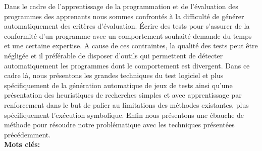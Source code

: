 \documentclass[
12pt, %
french, %
singlespacing, %
headsepline, %
]{MastersDoctoralThesis} %
\begin{document}





\newenvironment{abstract}%
{\cleardoublepage\thispagestyle{empty}\null\vfill\begin{center}%
\bfseries\abstractname\end{center}}%
{\vfill\null}

\begin{abstract}
Dans le cadre de l'apprentissage de la programmation et de l'évaluation des programmes des apprenants nous sommes confrontés à la difficulté de générer automatiquement des critères d'évaluation. Écrire des tests pour s'assurer de la conformité d'un programme avec un comportement souhaité demande du temps et une certaine expertise. A cause de ces contraintes, la qualité des tests peut être négligée et il préférable de disposer d'outils qui permettent de détecter automatiquement les programmes dont le comportement est divergent.
Dans ce cadre là, nous présentons les grandes techniques du test logiciel et plus spécifiquement de la génération automatique de jeux de tests ainsi qu'une présentation des heuristiques de recherches simples et avec apprentissage par renforcement dans le but de palier au limitations des méthodes existantes, plus spécifiquement l'exécution symbolique. Enfin nous présentons une ébauche de méthode pour résoudre notre problématique avec les techniques présentées précédemment.\\

\textbf{Mots clés:} \keywordnames
\end{abstract}
\end{document}

